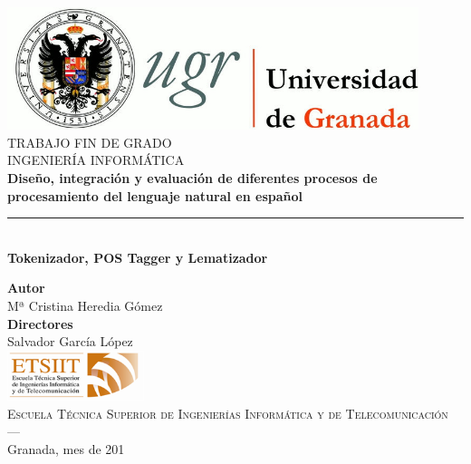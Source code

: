 \begin{titlepage}
 
\newlength{\centeroffset}
\setlength{\centeroffset}{-0.5\oddsidemargin}
\addtolength{\centeroffset}{0.5\evensidemargin}
\thispagestyle{empty}

\noindent\hspace*{\centeroffset}%

\centering
\includegraphics[width=0.9\textwidth]{imagenes/logo_ugr.jpg}\\[1.4cm]

\textsc{ \Large TRABAJO FIN DE GRADO\\[0.2cm]}
\textsc{ INGENIERÍA INFORMÁTICA}\\[1cm]
% 
{\Large\bfseries Diseño, integración y evaluación de diferentes procesos de procesamiento del lenguaje natural en español\\
}
\noindent\rule[-1ex]{\textwidth}{3pt}\\[3.5ex]
{\large\bfseries Tokenizador, POS Tagger y Lematizador}

\vspace{2.5cm}
\noindent\hspace*{\centeroffset}%
\centering

\textbf{Autor}\\ {Mª Cristina Heredia Gómez}\\[2.5ex]
\textbf{Directores}\\
{Salvador García López}\\[2cm]
\includegraphics[width=0.3\textwidth]{imagenes/etsiit_logo.png}\\[0.1cm]
\textsc{Escuela Técnica Superior de Ingenierías Informática y de Telecomunicación}\\
\textsc{---}\\
Granada, mes de 201
\end{titlepage}



